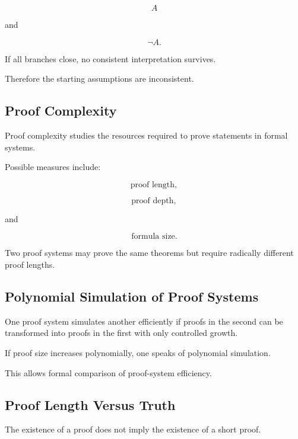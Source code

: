\[
\boxed{
A
}
\]

and

\[
\boxed{
\neg A.
}
\]

If all branches close, no consistent interpretation survives.

Therefore the starting assumptions are inconsistent.

\subsection{Proof Complexity}
\label{subsec:proof-complexity}

Proof complexity studies the resources required to prove statements in
formal systems.

Possible measures include:

\[
\boxed{
\text{proof length},
}
\]

\[
\boxed{
\text{proof depth},
}
\]

and

\[
\boxed{
\text{formula size}.
}
\]

Two proof systems may prove the same theorems but require radically
different proof lengths.

\subsection{Polynomial Simulation of Proof Systems}
\label{subsec:proof-system-simulation}

One proof system simulates another efficiently if proofs in the second can
be transformed into proofs in the first with only controlled growth.

If proof size increases polynomially, one speaks of polynomial simulation.

This allows formal comparison of proof-system efficiency.

\subsection{Proof Length Versus Truth}
\label{subsec:proof-length-versus-truth}

The existence of a proof does not imply the existence of a short proof.

